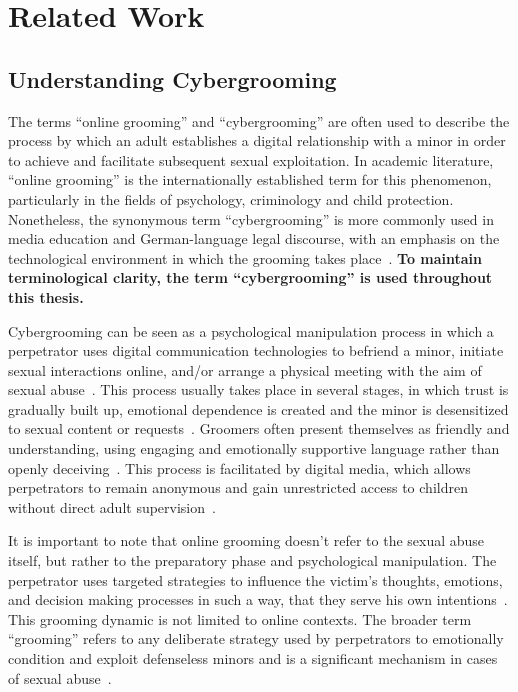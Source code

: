 \chapter{Related Work}

\section{Understanding Cybergrooming}
The terms “online grooming” and “cybergrooming” are often used to describe the process by which an adult establishes a digital relationship with a minor in order to achieve and facilitate subsequent sexual exploitation. In academic literature, “online grooming” is the internationally established term for this phenomenon, particularly in the fields of psychology, criminology and child protection. Nonetheless, the synonymous term “cybergrooming” is more commonly used in media education and German-language legal discourse, with an emphasis on the technological environment in which the grooming takes place~\cite{mladenovic2021cyber, schittenhelm2024cybergrooming}. \textbf{To maintain terminological clarity, the term “cybergrooming” is used throughout this thesis. } %

Cybergrooming can be seen as a psychological manipulation process in which a perpetrator uses digital communication technologies to befriend a minor, initiate sexual interactions online, and/or arrange a physical meeting with the aim of sexual abuse~\cite{webster2021european}. This process usually takes place in several stages, in which trust is gradually built up, emotional dependence is created and the minor is desensitized to sexual content or requests~\cite{whittle2013review}. Groomers often present themselves as friendly and understanding, using engaging and emotionally supportive language rather than openly deceiving~\cite{broome2020psycholinguistic}. This process is facilitated by digital media, which allows perpetrators to remain anonymous and gain unrestricted access to children without direct adult supervision~\cite{mladenovic2021cyber}. %

It is important to note that online grooming doesn't refer to the sexual abuse itself, but rather to the preparatory phase and psychological manipulation. The perpetrator uses targeted strategies to influence the victim's thoughts, emotions, and decision making processes in such a way, that they serve his own intentions~\cite{schittenhelm2024cybergrooming}. This grooming dynamic is not limited to online contexts. The broader term “grooming” refers to any deliberate strategy used by perpetrators to emotionally condition and exploit defenseless minors and is a significant mechanism in cases of sexual abuse~\cite{craven2006grooming}.

